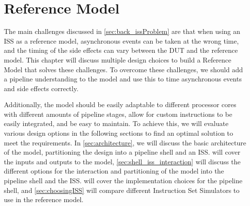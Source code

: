 \chapter{Reference Model}
\label{ch:Reference Model}

The main challenges discussed in \cref{sec:back_issProblem} are that when using an ISS as a reference model, asynchronous events can be taken at the wrong time, and the timing of the side effects can vary between the DUT and the reference model.
This chapter will discuss multiple design choices to build a Reference Model that solves these challenges. To overcome these challenges, we should add a pipeline understanding to the model and use this to time asynchronous events and side effects correctly.

Additionally, the model should be easily adaptable to different processor cores with different amounts of pipeline stages, allow for custom instructions to be easily integrated, and be easy to maintain. To achieve this, we will evaluate various design options in the following sections to find an optimal solution to meet the requirements. In \cref{sec:architecture}, we will discuss the basic architecture of the model, partitioning the design into a pipeline shell and an ISS.  will cover the inputs and outputs to the model, \cref{sec:shell_iss_interaction} will discuss the different options for the interaction and partitioning of the model into the pipeline shell and the ISS.  will cover the implementation choices for the pipeline shell, and \cref{sec:choosingISS} will compare different Instruction Set Simulators to use in the reference model.


%
%

